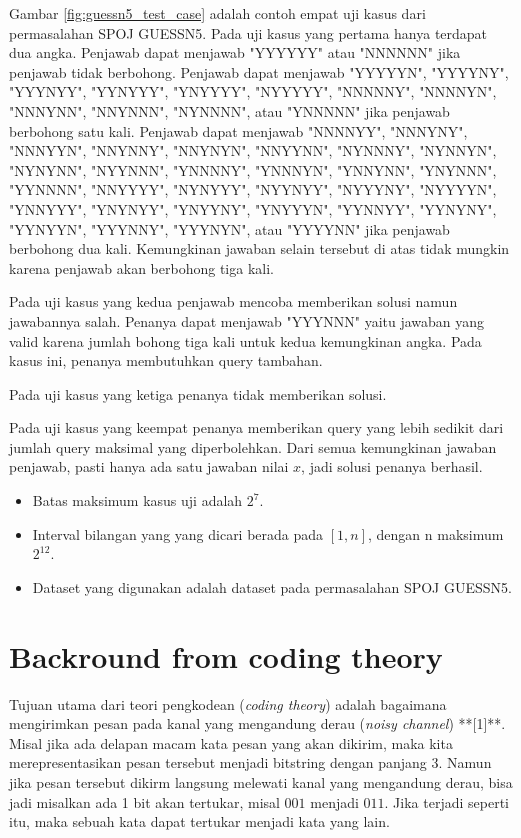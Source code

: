 \documentclass[conference,compsoc]{IEEEtran}
\begin{document}
Gambar \ref{fig:guessn5_test_case} adalah contoh empat uji kasus dari permasalahan SPOJ GUESSN5. Pada uji kasus yang pertama hanya terdapat dua angka. Penjawab dapat menjawab "YYYYYY" atau "NNNNNN" jika penjawab tidak berbohong. Penjawab dapat menjawab "YYYYYN", "YYYYNY", "YYYNYY", "YYNYYY", "YNYYYY", "NYYYYY", "NNNNNY", "NNNNYN", "NNNYNN", "NNYNNN", "NYNNNN", atau "YNNNNN" jika penjawab berbohong satu kali. Penjawab dapat menjawab "NNNNYY", "NNNYNY", "NNNYYN", "NNYNNY", "NNYNYN", "NNYYNN", "NYNNNY", "NYNNYN", "NYNYNN", "NYYNNN", "YNNNNY", "YNNNYN", "YNNYNN", "YNYNNN", "YYNNNN", "NNYYYY", "NYNYYY", "NYYNYY", "NYYYNY", "NYYYYN", "YNNYYY", "YNYNYY", "YNYYNY", "YNYYYN", "YYNNYY", "YYNYNY", "YYNYYN", "YYYNNY", "YYYNYN", atau "YYYYNN" jika penjawab berbohong dua kali. Kemungkinan jawaban selain tersebut di atas tidak mungkin karena penjawab akan berbohong tiga kali.

Pada uji kasus yang kedua penjawab mencoba memberikan solusi namun jawabannya salah. Penanya dapat menjawab "YYYNNN" yaitu jawaban yang valid karena jumlah bohong tiga kali untuk kedua kemungkinan angka. Pada kasus ini, penanya membutuhkan query tambahan.

Pada uji kasus yang ketiga penanya tidak memberikan solusi.

Pada uji kasus yang keempat penanya memberikan query yang lebih sedikit dari jumlah query maksimal yang diperbolehkan. Dari semua kemungkinan jawaban penjawab, pasti hanya ada satu jawaban nilai $x$, jadi solusi penanya berhasil.

\begin{itemize}
  \item Batas maksimum kasus uji adalah $2^7$.
  \item Interval bilangan yang yang dicari berada pada $[1,n]$, dengan n maksimum $2^12$.
  \item Dataset yang digunakan adalah dataset pada permasalahan SPOJ GUESSN5.
\end{itemize}


\section{Backround from coding theory}

Tujuan utama dari teori pengkodean (\textit{coding theory}) adalah bagaimana mengirimkan pesan pada kanal yang mengandung derau (\textit{noisy channel}) **[1]**. Misal jika ada delapan macam kata pesan yang akan dikirim, maka kita merepresentasikan pesan tersebut menjadi bitstring dengan panjang 3. Namun jika pesan tersebut dikirm langsung melewati kanal yang mengandung derau, bisa jadi misalkan ada 1 bit akan tertukar, misal $001$ menjadi $011$. Jika terjadi seperti itu, maka sebuah kata dapat tertukar menjadi kata yang lain.
\end{document}
